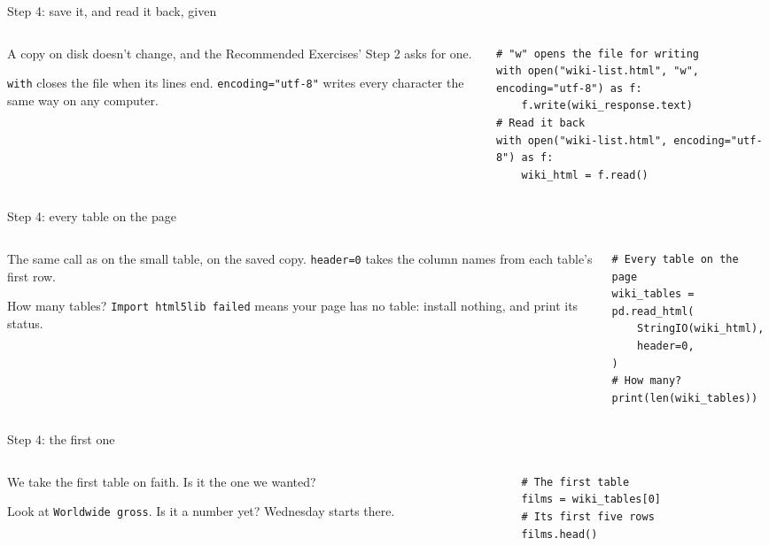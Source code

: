 \documentclass[9pt,aspectratio=169]{beamer}
\begin{document}
\begin{frame}[fragile]{Step 4: save it, and read it back, given}
    \begin{columns}[T]
        \begin{column}{0.37\textwidth}
            A copy on disk doesn't change, and the Recommended Exercises' Step 2 asks for one.

            \medskip
            \texttt{with} closes the file when its lines end. \texttt{encoding="utf-8"} writes every character the same way on any computer.
        \end{column}
        \begin{column}{0.6\textwidth}
\begin{lstlisting}
# "w" opens the file for writing
with open("wiki-list.html", "w", encoding="utf-8") as f:
    f.write(wiki_response.text)
# Read it back
with open("wiki-list.html", encoding="utf-8") as f:
    wiki_html = f.read()
\end{lstlisting}
        \end{column}
    \end{columns}
\end{frame}

\begin{frame}[fragile]{Step 4: every table on the page}
    \begin{columns}[T]
        \begin{column}{0.37\textwidth}
            The same call as on the small table, on the saved copy. \texttt{header=0} takes the column names from each table's first row.

            \medskip
            How many tables? \texttt{Import html5lib failed} means your page has no table: install nothing, and print its status.
        \end{column}
        \begin{column}{0.6\textwidth}
\begin{lstlisting}
# Every table on the page
wiki_tables = pd.read_html(
    StringIO(wiki_html),
    header=0,
)
# How many?
print(len(wiki_tables))
\end{lstlisting}
        \end{column}
    \end{columns}
\end{frame}

\begin{frame}[fragile]{Step 4: the first one}
    \begin{columns}[T]
        \begin{column}{0.37\textwidth}
            We take the first table on faith. Is it the one we wanted?

            \medskip
            Look at \texttt{Worldwide gross}. Is it a number yet? Wednesday starts there.
        \end{column}
        \begin{column}{0.6\textwidth}
\begin{lstlisting}
# The first table
films = wiki_tables[0]
# Its first five rows
films.head()
\end{lstlisting}
        \end{column}
    \end{columns}
\end{frame}
\end{document}
